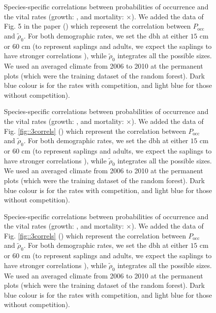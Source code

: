 \documentclass[letterpaper, 12pt]{article}
\theoremstyle{theo}
\begin{document}
\begin{refsection}
\begin{onehalfspace}
\begin{figure}
	\centering
	
	\caption[$ P_{\text{occ}} $ vs vital rates, species 5-8]{Species-specific correlations between probabilities of occurrence and the vital rates (growth: \CircSteel, and mortality: $ \times $). We added the data of Fig. 5 in the paper (\MoveUp) which represent the correlation between $ P_{\text{occ}} $ and $ \tilde \rho_0 $. For both demographic rates, we set the dbh at either $ 15 $ cm or $ 60 $ cm (to represent saplings and adults, we expect the saplings to have stronger correlations \citep{Kunstler2019}), while $ \tilde \rho_0 $ integrates all the possible sizes. We used an averaged climate from 2006 to 2010 at the permanent plots (which were the training dataset of the random forest). Dark blue colour is for the rates with competition, and light blue for those without competition). \label{fig::demog_Pocc5-8}}
\end{figure}

\begin{figure}
	\centering
	
	\caption[$ P_{\text{occ}} $ vs vital rates, species 9-12]{Species-specific correlations between probabilities of occurrence and the vital rates (growth: \CircSteel, and mortality: $ \times $). We added the data of Fig. \ref{fig::3correls} (\MoveUp) which represent the correlation between $ P_{\text{occ}} $ and $ \tilde \rho_0 $. For both demographic rates, we set the dbh at either $ 15 $ cm or $ 60 $ cm (to represent saplings and adults, we expect the saplings to have stronger correlations \citep{Kunstler2019}), while $ \tilde \rho_0 $ integrates all the possible sizes. We used an averaged climate from 2006 to 2010 at the permanent plots (which were the training dataset of the random forest). Dark blue colour is for the rates with competition, and light blue for those without competition). \label{fig::demog_Pocc9-12}}
\end{figure}

\begin{figure}
	\centering
	
	\caption[$ P_{\text{occ}} $ vs vital rates, species 13-14]{Species-specific correlations between probabilities of occurrence and the vital rates (growth: \CircSteel, and mortality: $ \times $). We added the data of Fig. \ref{fig::3correls} (\MoveUp) which represent the correlation between $ P_{\text{occ}} $ and $ \tilde \rho_0 $. For both demographic rates, we set the dbh at either $ 15 $ cm or $ 60 $ cm (to represent saplings and adults, we expect the saplings to have stronger correlations \citep{Kunstler2019}), while $ \tilde \rho_0 $ integrates all the possible sizes. We used an averaged climate from 2006 to 2010 at the permanent plots (which were the training dataset of the random forest). Dark blue colour is for the rates with competition, and light blue for those without competition). \label{fig::demog_Pocc13-14}}
\end{figure}

\end{onehalfspace}

\clearpage
\printbibliography[heading=subbibliography]
\end{refsection}
\end{document}
